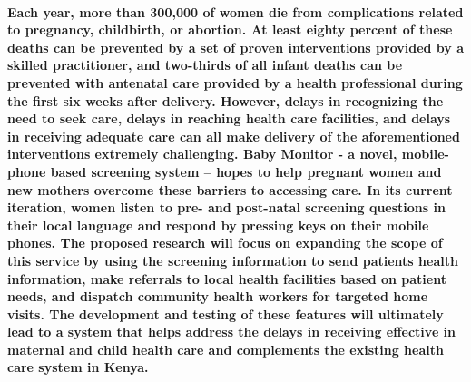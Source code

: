 \abstract

\paragraph{Each year, more than 300,000 of women die from complications related to pregnancy, childbirth, or abortion. At least eighty percent of these deaths can be prevented by a set of proven interventions provided by a skilled practitioner, and two-thirds of all infant deaths can be prevented with antenatal care provided by a health professional during the first six weeks after delivery. However, delays in recognizing the need to seek care, delays in reaching health care facilities, and delays in receiving adequate care can all make delivery of the aforementioned interventions extremely challenging. Baby Monitor -  a novel, mobile-phone based screening system – hopes to help pregnant women and new mothers overcome these barriers to accessing care. In its current iteration, women listen to pre- and post-natal screening questions in their local language and respond by pressing keys on their mobile phones. The proposed research will focus on expanding the scope of this service by using the screening information to send patients health information, make referrals to local health facilities based on patient needs, and dispatch community health workers for targeted home visits. The development and testing of these features will ultimately lead to a system that helps address the delays in receiving effective in maternal and child health care and complements the existing health care system in Kenya.}